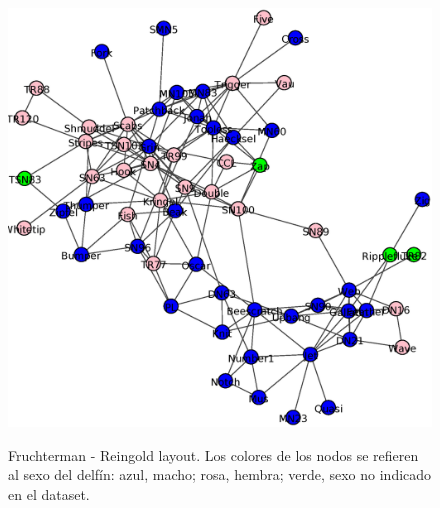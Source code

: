\begin{figure}[h]
\centering
\includegraphics[scale = 0.50]{figuras/FrutRein}
\label{fig:Layout_delfines}
\caption{Fruchterman - Reingold layout. Los colores de los nodos se refieren al sexo del delfín: azul, macho; rosa, hembra; verde, sexo no indicado en el dataset.}
\end{figure}

